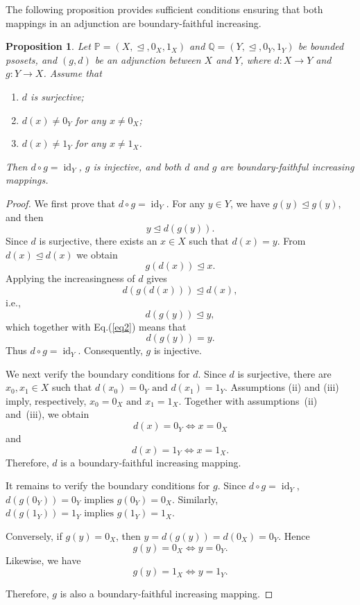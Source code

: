 \documentclass[preprint,12pt]{elsarticle}
\newtheorem{proposition}[theorem]{Proposition}
\begin{document}
The following proposition provides sufficient conditions ensuring that both mappings in an adjunction are boundary-faithful increasing.
\begin{proposition}\label{prop:Adjunction-boundary}
Let $\mathbb{P}=(X,\trianglelefteq,0_X,1_X)$ and $\mathbb{Q}=(Y,\trianglelefteq,0_Y,1_Y)$ be bounded psosets, and $(g,d)$ be an adjunction between $X$ and $Y$, where $d:X\to Y$ and $g:Y\to X$. Assume that
\begin{enumerate}[label=(\roman*)]
\item $d$ is surjective;
\item $d(x)\neq0_Y$ for any $x\neq0_X$;
\item $d(x)\neq1_Y$ for any $x\neq1_X$.
\end{enumerate}
Then
$d\circ g=\operatorname{id}_Y$,
$g$ is injective, and both $d$ and $g$ are boundary-faithful increasing mappings.
\end{proposition}

\begin{proof}
We first prove that
$d\circ g=\operatorname{id}_Y.$ For any $y\in Y$, we have $g(y)\trianglelefteq g(y)$, and then
\begin{equation}\label{eq2}
 y\trianglelefteq d(g(y)).
\end{equation}
Since $d$ is surjective, there exists an $x\in X$ such that $d(x)=y$. From
$
 d(x)\trianglelefteq d(x)
$
we obtain
$$
 g(d(x))\trianglelefteq x.
$$
Applying the increasingness of $d$ gives
$$
 d(g(d(x)))\trianglelefteq d(x),
$$
i.e.,
$$
 d(g(y))\trianglelefteq y,
$$
which together with Eq.(\ref{eq2}) means that
$$
 d(g(y))=y.
$$
Thus $d\circ g=\operatorname{id}_Y$. Consequently, $g$ is injective.

We next verify the boundary conditions for $d$. Since $d$ is surjective,
there are $x_0,x_1\in X$ such that
$
 d(x_0)=0_Y
 \mbox{ and }
 d(x_1)=1_Y.
$
Assumptions (ii) and (iii) imply, respectively,
$
 x_0=0_X
 \mbox{ and }
 x_1=1_X.
$
Together with assumptions~(ii) and~(iii), we obtain
$$
 d(x)=0_Y\Longleftrightarrow x=0_X
$$
and
$$
 d(x)=1_Y\Longleftrightarrow x=1_X.
$$
Therefore, $d$ is a boundary-faithful increasing mapping.

It remains to verify the boundary conditions for $g$. Since
$d\circ g=\operatorname{id}_Y$,
$
 d(g(0_Y))=0_Y\mbox{ implies } g(0_Y)=0_X.
$
Similarly,
$
 d(g(1_Y))=1_Y\mbox{ implies } g(1_Y)=1_X.
$

Conversely, if $g(y)=0_X$, then
$
 y=d(g(y))=d(0_X)=0_Y.
$
Hence
$$
 g(y)=0_X\Longleftrightarrow y=0_Y.
$$
Likewise, we have
$$
 g(y)=1_X\Longleftrightarrow y=1_Y.
$$

Therefore, $g$ is also a boundary-faithful increasing mapping.
\end{proof}
\end{document}
